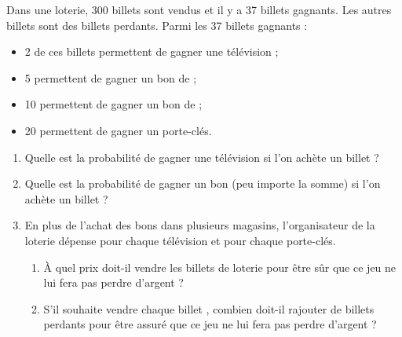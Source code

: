\begin{colonne*exercice}
\medskip


\begin{exercice} %
   Dans une loterie, 300 billets sont vendus et il y a 37 billets gagnants. Les autres billets sont des billets perdants. Parmi les 37 billets gagnants :
   \begin{itemize}
      \item 2 de ces billets permettent de gagner une télévision ;
      \item 5 permettent de gagner un bon de  ;
      \item 10 permettent de gagner un bon de  ;
      \item 20 permettent de gagner un porte-clés.
   \end{itemize}
   \vspace*{-5mm}
   \begin{enumerate}
      \item Quelle est la probabilité de gagner une télévision si l’on achète un billet ?
      \item Quelle est la probabilité de gagner un bon (peu importe la somme) si l’on achète un billet ?
      \item En plus de l’achat des bons dans plusieurs magasins, l’organisateur de la loterie dépense  pour chaque télévision et  pour chaque porte-clés.
      \begin{enumerate}
         \item À quel prix doit-il vendre les billets de loterie pour être sûr que ce jeu ne lui fera pas perdre d’argent ?
         \item S’il souhaite vendre chaque billet , combien doit-il rajouter de billets perdants pour être assuré que ce jeu ne lui fera pas perdre d’argent ? \\ [-10mm]
      \end{enumerate}
   \end{enumerate}
\end{exercice}


\end{colonne*exercice}
